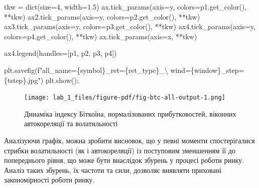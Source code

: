 \documentclass[
  letterpaper,
]{report}
\newenvironment{Shaded}{\begin{snugshade}}{\end{snugshade}}
\newcommand{\BuiltInTok}[1]{\textcolor[rgb]{0.00,0.23,0.31}{#1}}
\newcommand{\CharTok}[1]{\textcolor[rgb]{0.13,0.47,0.30}{#1}}
\newcommand{\DecValTok}[1]{\textcolor[rgb]{0.68,0.00,0.00}{#1}}
\newcommand{\FloatTok}[1]{\textcolor[rgb]{0.68,0.00,0.00}{#1}}
\newcommand{\NormalTok}[1]{\textcolor[rgb]{0.00,0.23,0.31}{#1}}
\newcommand{\OperatorTok}[1]{\textcolor[rgb]{0.37,0.37,0.37}{#1}}
\newcommand{\SpecialCharTok}[1]{\textcolor[rgb]{0.37,0.37,0.37}{#1}}
\newcommand{\SpecialStringTok}[1]{\textcolor[rgb]{0.13,0.47,0.30}{#1}}
\newcommand{\StringTok}[1]{\textcolor[rgb]{0.13,0.47,0.30}{#1}}
\begin{document}
\begin{Shaded}
\begin{Highlighting}[]
\NormalTok{tkw }\OperatorTok{=} \BuiltInTok{dict}\NormalTok{(size}\OperatorTok{=}\DecValTok{4}\NormalTok{, width}\OperatorTok{=}\FloatTok{1.5}\NormalTok{)}
\NormalTok{ax.tick\_params(axis}\OperatorTok{=}\StringTok{\textquotesingle{}y\textquotesingle{}}\NormalTok{, colors}\OperatorTok{=}\NormalTok{p1.get\_color(), }\OperatorTok{**}\NormalTok{tkw)}
\NormalTok{ax2.tick\_params(axis}\OperatorTok{=}\StringTok{\textquotesingle{}y\textquotesingle{}}\NormalTok{, colors}\OperatorTok{=}\NormalTok{p2.get\_color(), }\OperatorTok{**}\NormalTok{tkw)}
\NormalTok{ax3.tick\_params(axis}\OperatorTok{=}\StringTok{\textquotesingle{}y\textquotesingle{}}\NormalTok{, colors}\OperatorTok{=}\NormalTok{p3.get\_color(), }\OperatorTok{**}\NormalTok{tkw)}
\NormalTok{ax4.tick\_params(axis}\OperatorTok{=}\StringTok{\textquotesingle{}y\textquotesingle{}}\NormalTok{, colors}\OperatorTok{=}\NormalTok{p4.get\_color(), }\OperatorTok{**}\NormalTok{tkw)}
\NormalTok{ax.tick\_params(axis}\OperatorTok{=}\StringTok{\textquotesingle{}x\textquotesingle{}}\NormalTok{, }\OperatorTok{**}\NormalTok{tkw)}

\NormalTok{ax4.legend(handles}\OperatorTok{=}\NormalTok{[p1, p2, p3, p4])}

\NormalTok{plt.savefig(}\SpecialStringTok{f"all\_name=}\SpecialCharTok{\{}\NormalTok{symbol}\SpecialCharTok{\}}\SpecialStringTok{\_ret=}\SpecialCharTok{\{}\NormalTok{ret\_type}\SpecialCharTok{\}}\SpecialStringTok{\_}\CharTok{\textbackslash{}}
\SpecialStringTok{            wind=}\SpecialCharTok{\{}\NormalTok{window}\SpecialCharTok{\}}\SpecialStringTok{\_step=}\SpecialCharTok{\{}\NormalTok{tstep}\SpecialCharTok{\}}\SpecialStringTok{.jpg"}\NormalTok{)}
\NormalTok{plt.show()}\OperatorTok{;}
\end{Highlighting}
\end{Shaded}

\begin{figure}[H]

{\centering \texttt{[image: lab\_1\_files/figure-pdf/fig-btc-all-output-1.png]}

}

\caption{\label{fig-btc-all}Динаміка індексу Біткоїна, нормалізованих
прибутковостей, віконних автокореляції та волатильності}

\end{figure}

Аналізуючи графік, можна зробити висновок, що у певні моменти
спостерігалися стрибки волатильності (як і автокореляції) із поступовим
зменшенням її до попереднього рівня, що може бути внаслідок збурень у
процесі роботи ринку. Аналіз таких збурень, їх частоти та сили, дозволяє
виявляти приховані закономірності роботи ринку.
\end{document}
